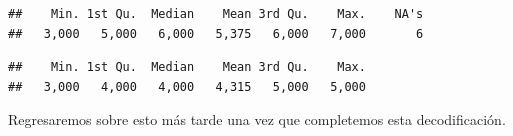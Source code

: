 \documentclass[]{article}
\newenvironment{Shaded}{\begin{snugshade}}{\end{snugshade}}
\newcommand{\KeywordTok}[1]{\textcolor[rgb]{0.13,0.29,0.53}{\textbf{#1}}}
\newcommand{\StringTok}[1]{\textcolor[rgb]{0.31,0.60,0.02}{#1}}
\newcommand{\OperatorTok}[1]{\textcolor[rgb]{0.81,0.36,0.00}{\textbf{#1}}}
\newcommand{\NormalTok}[1]{#1}
\begin{document}
\begin{verbatim}
##    Min. 1st Qu.  Median    Mean 3rd Qu.    Max.    NA's 
##   3,000   5,000   6,000   5,375   6,000   7,000       6
\end{verbatim}

\begin{Shaded}
\end{Shaded}

\begin{verbatim}
##    Min. 1st Qu.  Median    Mean 3rd Qu.    Max. 
##   3,000   4,000   4,000   4,315   5,000   5,000
\end{verbatim}

Regresaremos sobre esto más tarde una vez que completemos esta
decodificación.

\begin{Shaded}
\end{Shaded}
\end{document}
